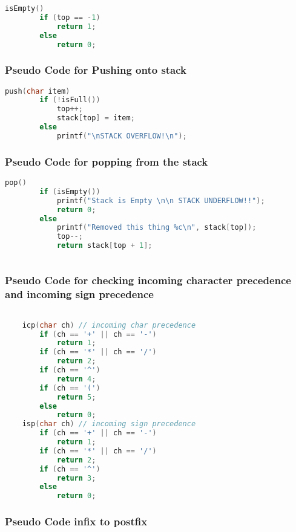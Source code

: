 \documentclass[11pt]{article}
\begin{document}
\begin{lstlisting}[language=C]
	isEmpty()
		if (top == -1)
			return 1;
		else
			return 0;
\end{lstlisting}\subsubsection{Pseudo Code for Pushing onto stack}

\begin{lstlisting}[language=C]
	push(char item)
		if (!isFull())
			top++;
			stack[top] = item;
		else
			printf("\nSTACK OVERFLOW!\n");
\end{lstlisting}\subsubsection{Pseudo Code for popping from the stack}

\begin{lstlisting}[language=C]
	pop()
		if (isEmpty())
			printf("Stack is Empty \n\n STACK UNDERFLOW!!");
			return 0;
		else
			printf("Removed this thing %c\n", stack[top]);
			top--;
			return stack[top + 1];
	
\end{lstlisting}\subsubsection{Pseudo Code for checking incoming character precedence and incoming sign precedence}

\begin{lstlisting}[language=C]

	icp(char ch) // incoming char precedence
		if (ch == '+' || ch == '-')
			return 1;
		if (ch == '*' || ch == '/')
			return 2;
		if (ch == '^')
			return 4;
		if (ch == '(')
			return 5;
		else
			return 0;
	isp(char ch) // incoming sign precedence
		if (ch == '+' || ch == '-')
			return 1;
		if (ch == '*' || ch == '/')
			return 2;
		if (ch == '^')
			return 3;
		else
			return 0;
\end{lstlisting}\subsubsection{Pseudo Code infix to postfix}
\end{document}
